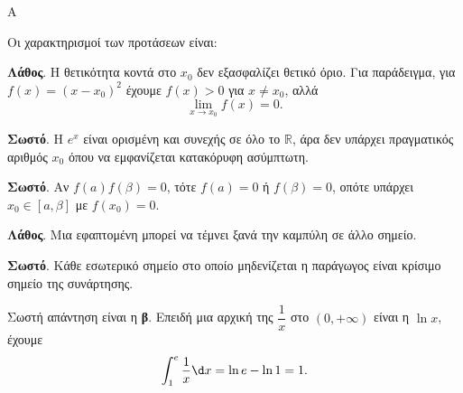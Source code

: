 \begin{thema}{Α}
\begin{erwthma}
\item {}

\item {}

\item {}

\item Οι χαρακτηρισμοί των προτάσεων είναι:
\begin{alist}
\item \textbf{Λάθος}. Η θετικότητα κοντά στο $x_0$ δεν εξασφαλίζει θετικό όριο. Για παράδειγμα, για $f(x)=(x-x_0)^2$ έχουμε $f(x)>0$ για $x\neq x_0$, αλλά
\[ \lim_{x\to x_0}f(x)=0. \]
\item \textbf{Σωστό}. Η $e^x$ είναι ορισμένη και συνεχής σε όλο το $\mathbb{R}$, άρα δεν υπάρχει πραγματικός αριθμός $x_0$ όπου να εμφανίζεται κατακόρυφη ασύμπτωτη.
\item \textbf{Σωστό}. Αν $f(a)f(\beta)=0$, τότε $f(a)=0$ ή $f(\beta)=0$, οπότε υπάρχει $x_0\in[a,\beta]$ με $f(x_0)=0$.
\item \textbf{Λάθος}. Μια εφαπτομένη μπορεί να τέμνει ξανά την καμπύλη σε άλλο σημείο.
\item \textbf{Σωστό}. Κάθε εσωτερικό σημείο στο οποίο μηδενίζεται η παράγωγος είναι κρίσιμο σημείο της συνάρτησης.
\end{alist}

\item Σωστή απάντηση είναι η \textbf{β}. Επειδή μια αρχική της $\dfrac{1}{x}$ στο $(0,+\infty)$ είναι η $\ln x$, έχουμε
\[ \dint_1^e \dfrac{1}{x}\d x=\ln e-\ln 1=1. \]
\end{erwthma}
\end{thema}

